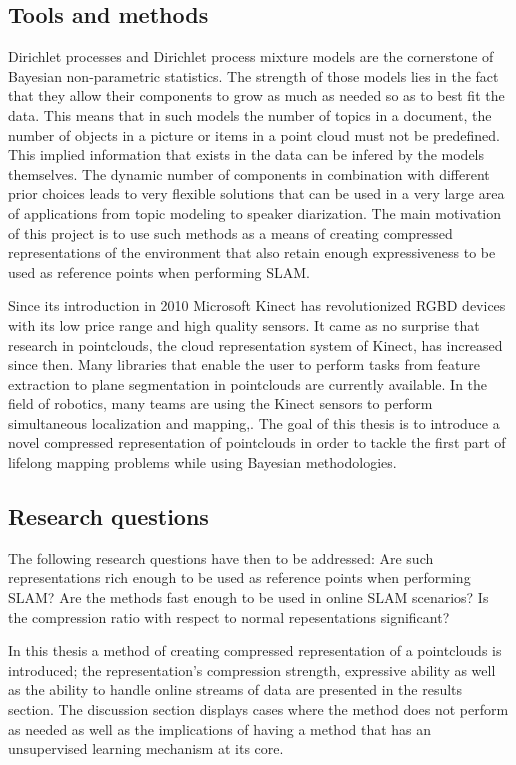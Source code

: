 \documentclass[twoside,hidelinks]{article}
\begin{document}
\subsection{Tools and methods}
Dirichlet processes and Dirichlet process mixture models \cite{nonParam} are the cornerstone of Bayesian non-parametric statistics. The strength of those models lies in the fact that they allow their components to grow as much as needed so as to best fit the data. This means that in such models the number of topics in a document, the number of objects in a picture or items in a point cloud must not be predefined. This implied information that exists in the data can be infered by the models themselves. The dynamic number of components in combination with different prior choices leads to very flexible solutions that can be used in a very large area of applications from topic modeling\cite{LDA} to speaker diarization\cite{speakerDiar}.
The main motivation of this project is to use such methods as a means of creating compressed representations of the environment that also retain enough expressiveness to be used as reference points when performing SLAM. 

Since its introduction in 2010 Microsoft Kinect\cite{kinect} has revolutionized RGBD devices with its low price range and high quality sensors. It came as no surprise that research in pointclouds, the cloud representation system of Kinect, has increased since then. Many libraries that enable the user to perform tasks from feature extraction to plane segmentation\cite{pcl} in pointclouds are currently available. In the field of robotics, many teams are using the Kinect sensors to perform simultaneous localization and mapping\cite{rtabmap},\cite{rgbdmapping}. The goal of this thesis is to introduce a novel compressed representation of pointclouds in order to tackle the first part of lifelong mapping problems while using Bayesian methodologies. 


\subsection{Research questions}


The following research questions have then to be addressed: Are such representations rich enough to be used as reference points when performing SLAM? Are the methods fast enough to be used in online SLAM scenarios? Is the compression ratio with respect to normal repesentations significant? 

In this thesis a method of creating compressed representation of a pointclouds is introduced; the representation's compression strength, expressive ability as well as the ability to handle online streams of data are presented in the results section. The discussion section displays cases where the method does not perform as needed as well as the implications of having a method that has an unsupervised learning mechanism at its core.  
\end{document}
